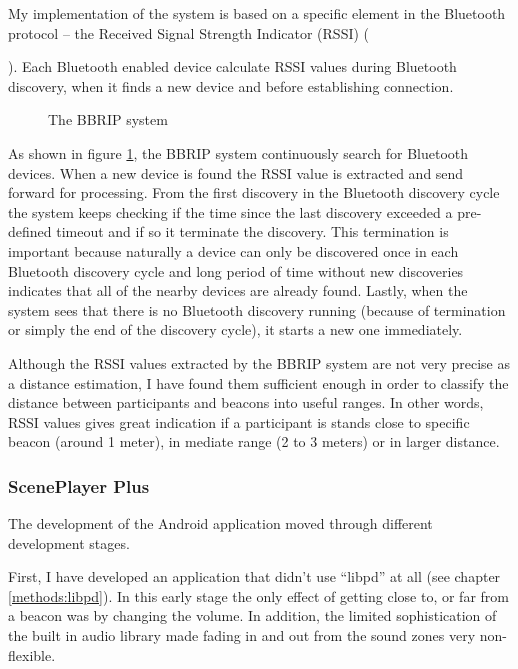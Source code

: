 \documentclass[a4paper,11pt]{article}
\begin{document}
My implementation of the system is based on a specific element in the Bluetooth protocol -- the Received Signal Strength Indicator (RSSI) ({\cite{bray12}).
Each Bluetooth enabled device calculate RSSI values during Bluetooth discovery, when it finds a new device and before establishing connection.

\begin{figure}[!htb]
	\centering
	\def\svgwidth{\columnwidth}
  	
	\caption{The BBRIP system}\label{fig:bbrip}
\end{figure}

As shown in figure \ref{fig:bbrip}, the BBRIP system continuously search for Bluetooth devices.
When a new device is found the RSSI value is extracted and send forward for processing.
From the first discovery in the Bluetooth discovery cycle the system keeps checking if the time since the last discovery exceeded a pre-defined timeout and if so it terminate the discovery.
This termination is important because naturally a device can only be discovered once in each Bluetooth discovery cycle and long period of time without new discoveries indicates that all of the nearby devices are already found.
Lastly, when the system sees that there is no Bluetooth discovery running (because of termination or simply the end of the discovery cycle), it starts a new one immediately.

Although the RSSI values extracted by the BBRIP system are not very precise as a distance estimation, I have found them sufficient enough in order to classify the distance between participants and beacons into useful ranges. In other words, RSSI values gives great indication if a participant is stands close to specific beacon (around 1 meter), in mediate range (2 to 3 meters) or in larger distance.

\subsubsection{ScenePlayer Plus}

The development of the Android application moved through different development stages.

First, I have developed an application that didn't use ``libpd'' at all (see chapter \ref{methods:libpd}).
In this early stage the only effect of getting close to, or far from a beacon was by changing the volume.
In addition, the limited sophistication of the built in audio library made fading in and out from the sound zones very non-flexible.

}
\end{document}
